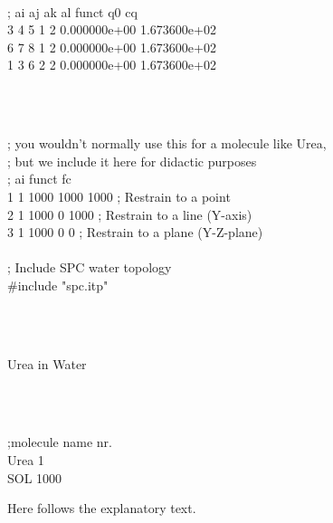 \begin{tt}
[ dihedrals ]\\
;  ai    aj    ak    al funct           q0           cq\\
    3     4     5     1     2 0.000000e+00 1.673600e+02 \\
    6     7     8     1     2 0.000000e+00 1.673600e+02 \\
    1     3     6     2     2 0.000000e+00 1.673600e+02 \\
\end{tt}\\
\begin{tt}
\\
; you wouldn't normally use this for a molecule like Urea,\\
; but we include it here for didactic purposes\\
; ai   funct    fc\\
   1     1     1000    1000    1000 ; Restrain to a point\\
   2     1     1000       0    1000 ; Restrain to a line (Y-axis)\\
   3     1     1000       0       0 ; Restrain to a plane (Y-Z-plane)\\
\\
; Include SPC water topology\\
\#include "spc.itp"\\
\end{tt}\\
\begin{tt}
[ system ]\\
Urea in Water\\
\end{tt}\\
\begin{tt}
[ molecules ]\\
;molecule name   nr.\\
Urea             1\\
SOL              1000\\
\end{tt}

Here follows the explanatory text.

